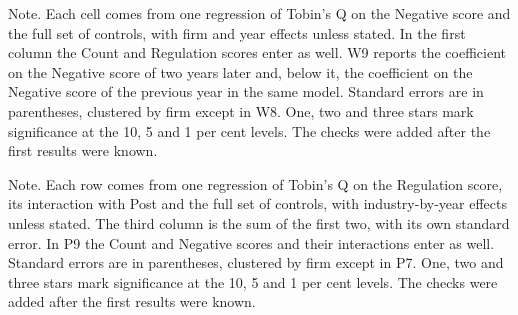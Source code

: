 \documentclass[12pt,a4paper]{article}
\newcommand{\tablenote}[1]{\par\smallskip\begin{minipage}{\linewidth}\footnotesize\setstretch{1.05}#1\end{minipage}}
\newcommand{\widetable}[1]{\resizebox{\ifdim\width>\linewidth\linewidth\else\width\fi}{!}{}}
\begin{document}
\begin{table}[!htbp]
\centering\small
\caption{Checks on the within-firm result for the Negative score}\label{tab:tonechecks}
\widetable{tables/tab_tone_checks}
\tablenote{Note. Each cell comes from one regression of Tobin's Q on the Negative score and the full set of controls, with firm and year effects unless stated. In the first column the Count and Regulation scores enter as well. W9 reports the coefficient on the Negative score of two years later and, below it, the coefficient on the Negative score of the previous year in the same model. Standard errors are in parentheses, clustered by firm except in W8. One, two and three stars mark significance at the 10, 5 and 1 per cent levels. The checks were added after the first results were known.}
\end{table}

\begin{table}[!htbp]
\centering\small
\caption{Checks on the interaction of the Regulation score with the period from fiscal year 2022}\label{tab:regchecks}
\widetable{tables/tab_regulation_checks}
\tablenote{Note. Each row comes from one regression of Tobin's Q on the Regulation score, its interaction with Post and the full set of controls, with industry-by-year effects unless stated. The third column is the sum of the first two, with its own standard error. In P9 the Count and Negative scores and their interactions enter as well. Standard errors are in parentheses, clustered by firm except in P7. One, two and three stars mark significance at the 10, 5 and 1 per cent levels. The checks were added after the first results were known.}
\end{table}
\end{document}
